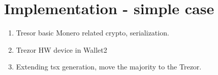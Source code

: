 \documentclass[]{article}
\begin{document}
\section{Implementation - simple case}

\begin{enumerate}
	\item Tresor basic Monero related crypto, serialization.
	\item Trezor HW device in Wallet2
	\item Extending tsx generation, move the majority to the Trezor.
	
\end{enumerate}





{}

	
\end{document}
